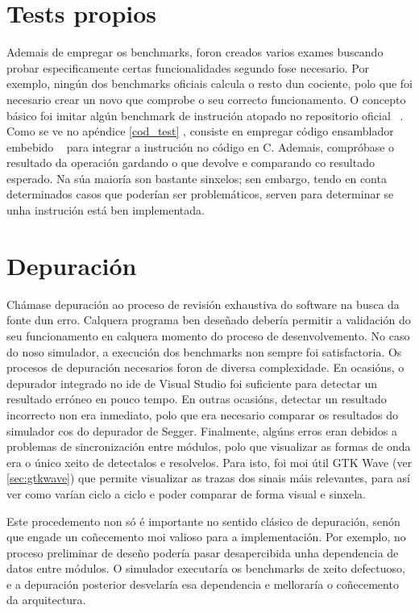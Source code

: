 \section{Tests propios}\label{sec:tests}
Ademais de empregar os benchmarks, foron creados varios exames buscando probar especificamente certas funcionalidades segundo fose necesario. Por exemplo, ningún dos benchmarks oficiais calcula o resto dun cociente, polo que foi necesario crear un novo que comprobe o seu correcto funcionamento. O concepto básico foi imitar algún benchmark de instrución atopado no repositorio oficial ~\cite{riscv_tests}. Como se ve no apéndice \ref{cod_test} , consiste en empregar código ensamblador embebido ~\cite{asm_emb} para integrar a instrución no código en C. Ademais, compróbase o resultado da operación gardando o que devolve e comparando co resultado esperado. Na súa maioría son bastante sinxelos; sen embargo, tendo en conta determinados casos que poderían ser problemáticos, serven para determinar se unha instrución está ben implementada.


\section{Depuración}\label{sec:depuración}

Chámase depuración ao proceso de revisión exhaustiva do software na busca da fonte dun erro. Calquera programa ben deseñado debería permitir a validación do seu funcionamento en calquera momento do  proceso de desenvolvemento. No caso do noso simulador, a execución dos benchmarks non sempre foi satisfactoria. Os procesos de depuración necesarios foron de diversa complexidade. En ocasións, o depurador integrado no \acrshort{ide} de Visual Studio foi suficiente para detectar un resultado erróneo en pouco tempo. En outras ocasións, detectar un resultado incorrecto non era inmediato, polo que era necesario comparar os resultados do simulador cos do depurador de Segger. Finalmente, algúns erros eran debidos a problemas de sincronización entre módulos, polo que visualizar as formas de onda era o único xeito de detectalos e resolvelos. Para isto, foi moi útil GTK Wave (ver \ref{sec:gtkwave}) que permite visualizar as trazas dos sinais máis relevantes, para así ver como varían ciclo a ciclo e poder comparar de forma visual e sinxela.

Este procedemento non só é importante no sentido clásico de depuración, senón que engade un coñecemento moi valioso para a implementación. Por exemplo, no proceso preliminar de deseño podería pasar desapercibida unha dependencia de datos entre módulos. O simulador executaría os benchmarks de xeito defectuoso, e a depuración posterior desvelaría esa dependencia e melloraría o coñecemento da arquitectura. 

